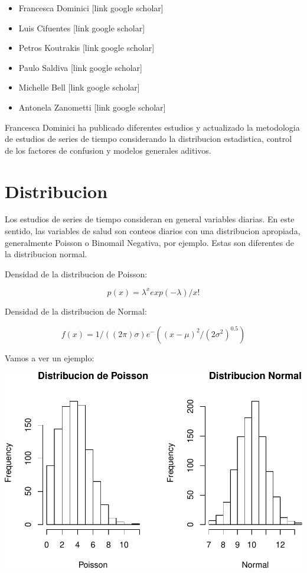 \documentclass[]{book}
\providecommand{\tightlist}{%
  \setlength{\itemsep}{0pt}\setlength{\parskip}{0pt}}
\begin{document}
\begin{itemize}
\tightlist
\item
  Francesca Dominici {[}link google scholar{]}
\item
  Luis Cifuentes {[}link google scholar{]}
\item
  Petros Koutrakis {[}link google scholar{]}
\item
  Paulo Saldiva {[}link google scholar{]}
\item
  Michelle Bell {[}link google scholar{]}
\item
  Antonela Zanometti {[}link google scholar{]}
\end{itemize}

Francesca Dominici ha publicado diferentes estudios y actualizado la metodologia de estudios de series de tiempo considerando la distribucion estadistica, control de los factores de confusion y modelos generales aditivos.

\hypertarget{distribucion}{%
\section{Distribucion}\label{distribucion}}

Los estudios de series de tiempo consideran en general variables diarias. En este sentido, las variables de salud son conteos diarios con una distribucion apropiada, generalmente Poisson o Binomail Negativa, por ejemplo. Estas son diferentes de la distribucion normal.

Densidad de la distribucion de Poisson:

\begin{equation}
p(x) = \lambda^x exp(-\lambda)/x!
\label{eq:12}
\end{equation}

Densidad de la distribucion de Normal:

\begin{equation}
f(x) = 1/( (2 \pi) \sigma) e^-((x - \mu)^2/(2 \sigma^2)^0.5 )
\label{eq:13}
\end{equation}

Vamos a ver un ejemplo:

\includegraphics[height=1.5\textheight]{bookdown-demo_files/figure-latex/unnamed-chunk-56-1}
\end{document}
